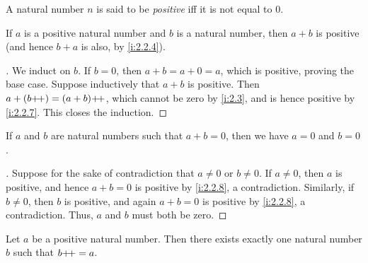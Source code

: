 \begin{defn}\label{i:2.2.7}
  A natural number \(n\) is said to be \emph{positive} iff it is not equal to \(0\).
\end{defn}

\begin{prop}\label{i:2.2.8}
  If \(a\) is a positive natural number and \(b\) is a natural number, then \(a + b\) is positive (and hence \(b + a\) is also, by \cref{i:2.2.4}).
\end{prop}

\begin{proof}[]
  We induct on \(b\).
  If \(b = 0\), then \(a + b = a + 0 = a\), which is positive, proving the base case.
  Suppose inductively that \(a + b\) is positive.
  Then \(a + (b{+}\!{+}) = (a + b){+}\!{+}\), which cannot be zero by \cref{i:2.3}, and is hence positive by \cref{i:2.2.7}.
  This closes the induction.
\end{proof}

\begin{cor}\label{i:2.2.9}
  If \(a\) and \(b\) are natural numbers such that \(a + b = 0\), then we have \(a = 0\) and \(b = 0\).
\end{cor}

\begin{proof}[]
  Suppose for the sake of contradiction that \(a \neq 0\) or \(b \neq 0\).
  If \(a \neq 0\), then \(a\) is positive, and hence \(a + b = 0\) is positive by \cref{i:2.2.8}, a contradiction.
  Similarly, if \(b \neq 0\), then \(b\) is positive, and again \(a + b = 0\) is positive by \cref{i:2.2.8}, a contradiction.
  Thus, \(a\) and \(b\) must both be zero.
\end{proof}

\begin{lem}\label{i:2.2.10}
  Let \(a\) be a positive natural number.
  Then there exists exactly one natural number \(b\) such that \(b{+}\!{+} = a\).
\end{lem}

